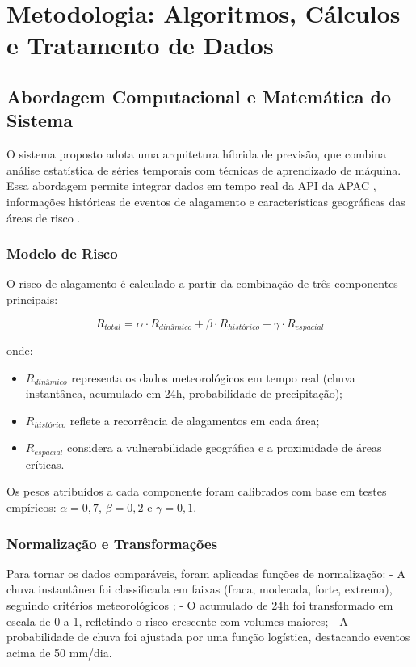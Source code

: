 \chapter{Metodologia: Algoritmos, Cálculos e Tratamento de Dados}

\section{Abordagem Computacional e Matemática do Sistema}

O sistema proposto adota uma arquitetura híbrida de previsão, que combina análise estatística de séries temporais com técnicas de aprendizado de máquina. Essa abordagem permite integrar dados em tempo real da API da APAC \cite{alves_apac}, informações históricas de eventos de alagamento \cite{carvalho2025sistema} e características geográficas das áreas de risco \cite{domingos2025mapeamento}.

\subsection{Modelo de Risco}

O risco de alagamento é calculado a partir da combinação de três componentes principais:

\begin{equation}
R_{total} = \alpha \cdot R_{dinâmico} + \beta \cdot R_{histórico} + \gamma \cdot R_{espacial}
\end{equation}

onde:
\begin{itemize}
    \item $R_{dinâmico}$ representa os dados meteorológicos em tempo real (chuva instantânea, acumulado em 24h, probabilidade de precipitação);
    \item $R_{histórico}$ reflete a recorrência de alagamentos em cada área;
    \item $R_{espacial}$ considera a vulnerabilidade geográfica e a proximidade de áreas críticas.
\end{itemize}

Os pesos atribuídos a cada componente foram calibrados com base em testes empíricos: $\alpha = 0,7$, $\beta = 0,2$ e $\gamma = 0,1$.

\subsection{Normalização e Transformações}

Para tornar os dados comparáveis, foram aplicadas funções de normalização:
- A chuva instantânea foi classificada em faixas (fraca, moderada, forte, extrema), seguindo critérios meteorológicos \cite{wilson2016analise};
- O acumulado de 24h foi transformado em escala de 0 a 1, refletindo o risco crescente com volumes maiores;
- A probabilidade de chuva foi ajustada por uma função logística, destacando eventos acima de 50 mm/dia.

